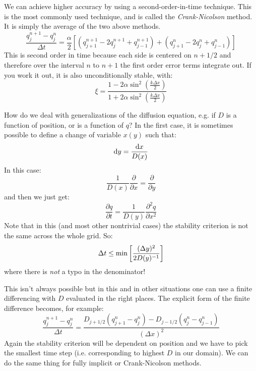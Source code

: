 We can achieve higher accuracy by using a second-order-in-time
technique.  This is the most commonly used technique, and is called
the {\it Crank-Nicolson} method. It is simply the average of the two
above methods. 
\begin{equation}
\frac{q_j^{n+1} - q_j^n}{\Delta t}
= \frac{\alpha}{2}
\left[
  \left(q_{j+1}^{n+1} - 2 q_j^{n+1} + q_{j-1}^{n+1}\right) + 
  \left(q_{j+1}^{n} - 2 q_j^{n} + q_{j-1}^{n}\right)
\right]
\end{equation}
This is second order in time because each side is centered on $n+1/2$
and therefore over the interval $n$ to $n+1$ the first order error
terms integrate out. If you work it out, it is also unconditionally
stable, with:
\begin{equation}
 \xi = \frac{1 - 2 \alpha \sin^2\left(\frac{k\Delta x}{2} \right)}{1 + 2 \alpha \sin^2\left(\frac{k\Delta x}{2} \right)}
\end{equation}

How do we deal with generalizations of the diffusion equation, e.g. if
$D$ is a function of position, or is a function of $q$? In the first
case, it is sometimes possible to define a change of variable $x(y)$
such that:
\begin{equation}
 {\rm d}y = \frac{{\rm d}x}{D(x)}
\end{equation}
In this case:
\begin{equation}
\frac{1}{D(x)} \frac{\partial}{\partial x} = \frac{\partial}{\partial
y}
\end{equation}
and then we just get:
\begin{equation}
\frac{\partial q}{\partial t} = \frac{1}{D(y)}\frac{\partial^2
q}{\partial x^2}
\end{equation}
Note that in this (and most other nontrivial cases) the stability
criterion is not the same across the whole grid. So:
\begin{equation}
\Delta t \le {\rm min} \left[\frac{(\Delta y)^2}{2 D(y)^{-1}}\right]
\end{equation}
where there is {\it not} a typo in the denominator! 

This isn't always possible but in this and in other situations one can
use a finite differencing with $D$ evaluated in the right places.
The explicit form of the finite difference becomes, for example:
\begin{equation}
 \frac{q_j^{n+1} - q_j^n}{\Delta t}
  = \frac{D_{j+1/2} \left(q_{j+1}^n - q_{j}^n\right) -
  D_{j-1/2} \left(q_j^n - q_{j-1}^n\right)}{(\Delta x)^2}
\end{equation}
Again the stability criterion will be dependent on position and we
have to pick the smallest time step (i.e. corresponding to highest
$D$ in our domain). We can do the same thing for fully implicit or
Crank-Nicolson methods. 

